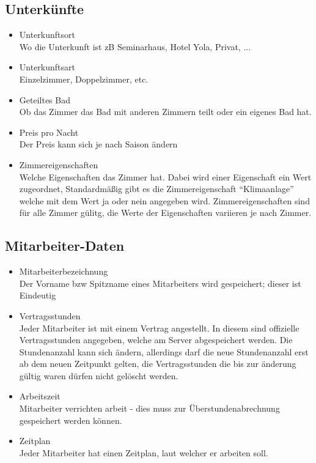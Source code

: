 \subsection{Unterkünfte}\label{unterkunft:dat}
\begin{itemize}[leftmargin=1.0in]
    \item [\ld] Unterkunftsort\\
        Wo die Unterkunft ist zB Seminarhaus, Hotel Yola, Privat, ...
    \item [\ld] Unterkunftsart\\
        Einzelzimmer, Doppelzimmer, etc.
    \item [\ld] Geteiltes Bad\\
        Ob das Zimmer das Bad mit anderen Zimmern teilt oder ein eigenes Bad hat.
    \item [\ld] Preis pro Nacht\\
        Der Preis kann sich je nach Saison ändern
    \item [\ld] \label{unterkunft:zeigenschaft} Zimmereigenschaften\\
        Welche Eigenschaften das Zimmer hat. Dabei wird einer Eigenschaft ein Wert zugeordnet, Standardmäßig gibt es die Zimmereigenschaft ``Klimaanlage'' welche mit dem Wert ja oder nein angegeben wird. Zimmereigenschaften sind für alle Zimmer gülitg, die Werte der Eigenschaften variieren je nach Zimmer.
\end{itemize}
\subsection{Mitarbeiter-Daten}\label{mitarb:dat}
\begin{itemize}[leftmargin=1.0in]
    \item [\ld] Mitarbeiterbezeichnung\\
        Der Vorname bzw Spitzname eines Mitarbeiters wird gespeichert; dieser ist Eindeutig 
    \item [\ld] Vertragsstunden\\
        Jeder Mitarbeiter ist mit einem Vertrag angestellt. In diesem sind offizielle Vertragsstunden angegeben, welche am Server abgespeichert werden. Die Stundenanzahl kann sich ändern, allerdings darf die neue Stundenanzahl erst ab dem neuen Zeitpunkt gelten, die Vertragsstunden die bis zur änderung gültig waren dürfen nicht gelöscht werden.
    \item [\ld] Arbeitszeit\\
        Mitarbeiter verrichten arbeit - dies muss zur Überstundenabrechnung gespeichert werden können.
    \item [\ld] Zeitplan\\
        Jeder Mitarbeiter hat einen Zeitplan, laut welcher er arbeiten soll.
\end{itemize}



